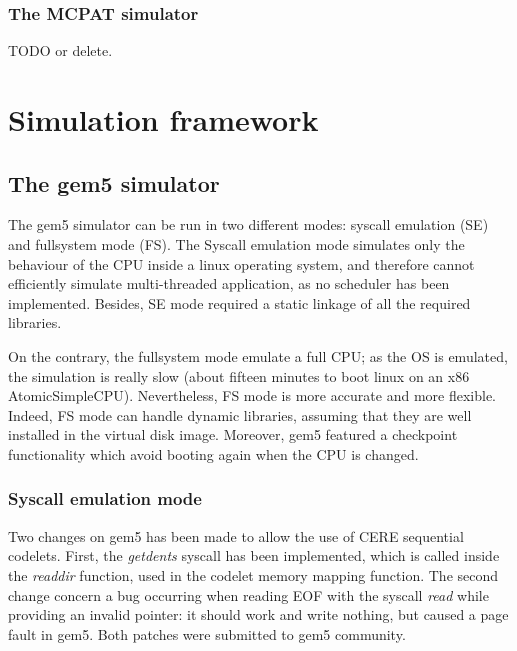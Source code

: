 \documentclass{article}
\begin{document}
\begin{multicols}{2}
\subsubsection*{The MCPAT simulator}
TODO or delete.


\section{Simulation framework}
\label{sim}

\subsection{The gem5 simulator}

The gem5 simulator can be run in two different modes: syscall emulation (SE) and fullsystem mode (FS). The Syscall emulation mode simulates only the behaviour of the CPU inside a linux operating system, and therefore cannot efficiently simulate multi-threaded application, as no scheduler has been implemented. Besides, SE mode required a static linkage of all the required libraries.

On the contrary, the fullsystem mode emulate a full CPU; as the OS is emulated, the simulation is really slow (about fifteen minutes to boot linux on an x86 AtomicSimpleCPU). Nevertheless, FS mode is more accurate and more flexible. Indeed, FS mode can handle dynamic libraries, assuming that they are well installed in the virtual disk image. 
Moreover, gem5 featured a checkpoint functionality which avoid booting again when the CPU is changed.


\subsubsection{Syscall emulation mode}
Two changes on gem5 has been made to allow the use of CERE sequential codelets. First, the \textit{getdents} syscall has been implemented, which is called inside the \textit{readdir} function, used in the codelet memory mapping function. The second change concern a bug occurring when reading EOF with the syscall \textit{read} while providing an invalid pointer: it should work and write nothing, but caused a page fault in gem5. Both patches were submitted to gem5 community.


\end{multicols}
\end{document}
